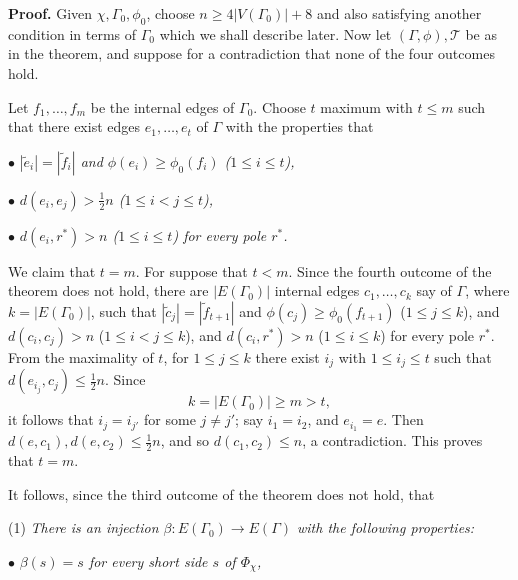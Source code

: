 \textbf{Proof.} Given $\chi, \Gamma_0, \phi_0$, choose $n \ge 4|V(\Gamma_0)| + 8$ and also satisfying another condition in terms of $\Gamma_0$ which we shall describe later. Now let $(\Gamma, \phi), \mathscr{T}$ be as in the theorem, and suppose for a contradiction that none of the four outcomes hold.

Let $f_1, \dots, f_m$ be the internal edges of $\Gamma_0$. Choose $t$ maximum with $t \le m$ such that there exist edges $e_1, \dots, e_t$ of $\Gamma$ with the properties that

\hspace*{12pt}$\bullet$ \textit{$|\tilde{e}_i| = |\tilde{f}_i|$ and $\phi(e_i) \ge \phi_0(f_i)$ ($1 \le i \le t$),}

\hspace*{12pt}$\bullet$ \textit{$d(e_i, e_j) > \frac{1}{2}n$ ($1 \le i < j \le t$),}

\hspace*{12pt}$\bullet$ \textit{$d(e_i, r^*) > n$ ($1 \le i \le t$) for every pole $r^*$.}

We claim that $t = m$. For suppose that $t < m$. Since the fourth outcome of the theorem does not hold, there are $|E(\Gamma_0)|$ internal edges $c_1, \dots, c_k$ say of $\Gamma$, where $k = |E(\Gamma_0)|$, such that $|\tilde{c}_j| = |\tilde{f}_{t+1}|$ and $\phi(c_j) \ge \phi_0(f_{t+1})$ ($1 \le j \le k$), and $d(c_i, c_j) > n$ ($1 \le i < j \le k$), and $d(c_i, r^*) > n$ ($1 \le i \le k$) for every pole $r^*$. From the maximality of $t$, for $1 \le j \le k$ there exist $i_j$ with $1 \le i_j \le t$ such that $d(e_{i_j}, c_j) \le \frac{1}{2}n$. Since
\begin{equation*}
k = |E(\Gamma_0)| \ge m > t,
\end{equation*}
it follows that $i_j = i_{j'}$ for some $j \ne j'$; say $i_1 = i_2$, and $e_{i_1} = e$. Then $d(e, c_1), d(e, c_2) \le \frac{1}{2}n$, and so $d(c_1, c_2) \le n$, a contradiction. This proves that $t = m$.

It follows, since the third outcome of the theorem does not hold, that

\hspace*{12pt}(1) \textit{There is an injection $\beta \colon E(\Gamma_0) \to E(\Gamma)$ with the following properties:}

\hspace*{12pt}$\bullet$ \textit{$\beta(s) = s$ for every short side $s$ of $\Phi_\chi$,}

